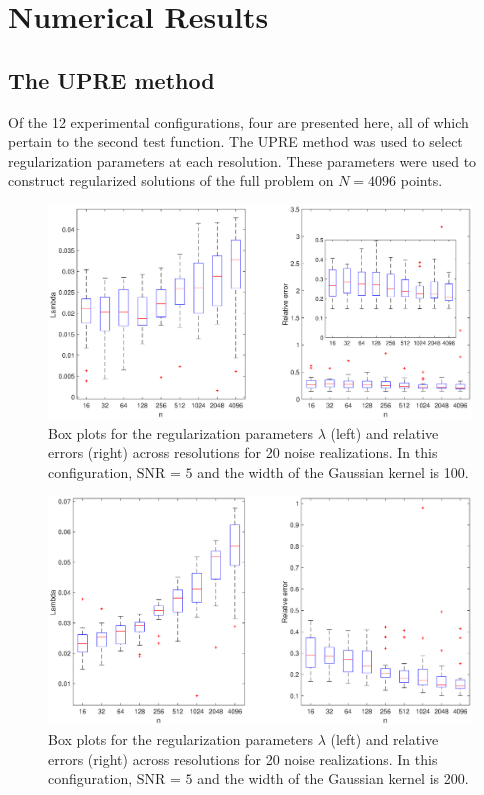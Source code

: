 \documentclass[12pt]{article}
\newcommand{\regparam}{\lambda}
\begin{document}
\section{Numerical Results} \label{Numerical results}

\subsection{The UPRE method}
Of the 12 experimental configurations, four are presented here, all of which pertain to the second test function. The UPRE method was used to select regularization parameters at each resolution. These parameters were used to construct regularized solutions of the full problem on $N = 4096$ points.

\begin{figure}
	\centerline{\includegraphics[scale = 0.4]{Figures/BothBoxes1D_F2_S05_W100_R20.eps}}
\caption{Box plots for the regularization parameters $\regparam$ (left) and relative errors (right) across resolutions for 20 noise realizations. In this configuration, $\text{SNR = 5}$ and the width of the Gaussian kernel is 100.}
\label{BothBoxes1D_F2_S05_W100_R20}
\end{figure}

\begin{figure}
	\centerline{\includegraphics[scale = 0.4]{Figures/BothBoxes1D_F2_S05_W200_R20.eps}}
\caption{Box plots for the regularization parameters $\regparam$ (left) and relative errors (right) across resolutions for 20 noise realizations. In this configuration, $\text{SNR = 5}$ and the width of the Gaussian kernel is 200.}
\end{figure}
\end{document}
